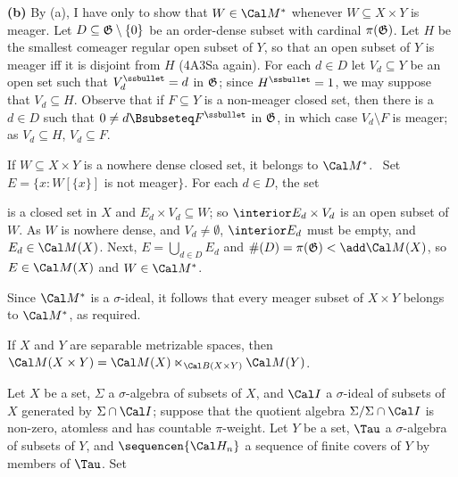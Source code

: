 {\medskip

{\bf (b)} By (a), I have only to show that $W\in\Cal M^*$ whenever
$W\subseteq X\times Y$ is meager.   Let
$D\subseteq\frak G\setminus\{0\}$ be an order-dense subset with cardinal
$\pi(\frak G)$.
Let $H$ be the smallest comeager regular open subset of $Y$, so that an
open subset of $Y$ is meager iff it is disjoint from $H$ (4A3Sa again).   For
each $d\in D$ let $V_d\subseteq Y$
be an open set such that $V_d^{\ssbullet}=d$ in $\frak G$;  since
$H^{\ssbullet}=1$, we may suppose that $V_d\subseteq H$.   Observe that
if $F\subseteq Y$ is a non-meager closed set,
then there is a $d\in D$ such that $0\ne d\Bsubseteq F^{\ssbullet}$ in
$\frak G$, in which case $V_d\setminus F$ is meager;  as
$V_d\subseteq H$, $V_d\subseteq F$.

If $W\subseteq X\times Y$ is a nowhere dense closed set, it belongs to
$\Cal M^*$.   \Prf\   Set $E=\{x:W[\{x\}]$ is not meager$\}$.   For each
$d\in D$, the set


\noindent is a closed set in $X$ and $E_d\times V_d\subseteq W$;  so
$\interior E_d\times V_d$ is an open subset of $W$.   As $W$ is nowhere
dense, and $V_d\ne\emptyset$, $\interior E_d$ must be
empty, and $E_d\in\Cal M(X)$.   Next, $E=\bigcup_{d\in D}E_d$ and
$\#(D)=\pi(\frak G)<\add\Cal M(X)$, so $E\in\Cal M(X)$ and
$W\in\Cal M^*$.\ \Qed

Since $\Cal M^*$ is a $\sigma$-ideal, it follows that every meager
subset of $X\times Y$ belongs to $\Cal M^*$, as required.
}%

 If $X$ and $Y$ are separable metrizable spaces,
then $\Cal M(X\times Y)=\Cal M(X)\ltimes_{\Cal B(X\times Y)}\Cal M(Y)$.



Let $X$ be a set, $\Sigma$ a $\sigma$-algebra of subsets of $X$, and
$\Cal I$ a $\sigma$-ideal of subsets of $X$ generated by
$\Sigma\cap\Cal I$;  suppose that
the quotient algebra $\Sigma/\Sigma\cap\Cal I$ is non-zero, atomless and
has countable $\pi$-weight.
Let $Y$ be a set, $\Tau$ a $\sigma$-algebra of subsets of $Y$, and
$\sequencen{\Cal H_n}$ a sequence of finite covers of $Y$ by members of
$\Tau$.   Set

